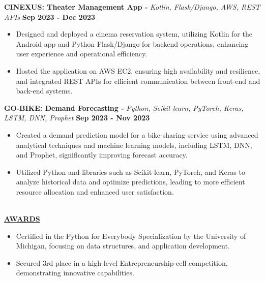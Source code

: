 \documentclass{article}
\begin{document}
\noindent \textbf{CINEXUS: Theater Management App -} \textit{Kotlin, Flask/Django, AWS, REST APIs} \hfill \textbf{Sep 2023 - Dec 2023}
\begin{itemize}[noitemsep,nolistsep,leftmargin=*]
\item {\small Designed and deployed a cinema reservation system, utilizing Kotlin for the Android app and Python Flask/Django for backend operations, enhancing user experience and operational efficiency.}
\item {\small Hosted the application on AWS EC2, ensuring high availability and resilience, and integrated REST APIs for efficient communication between front-end and back-end systems.}
\end{itemize}

\noindent \textbf{GO-BIKE: Demand Forecasting -} \textit{Python, Scikit-learn, PyTorch, Keras, LSTM, DNN, Prophet} \hfill \textbf{Sep 2023 - Nov 2023}
\begin{itemize}[noitemsep,nolistsep,leftmargin=*]
\item {\small Created a demand prediction model for a bike-sharing service using advanced analytical techniques and machine learning models, including LSTM, DNN, and Prophet, significantly improving forecast accuracy.}
\item {\small Utilized Python and libraries such as Scikit-learn, PyTorch, and Keras to analyze historical data and optimize predictions, leading to more efficient resource allocation and enhanced user satisfaction.}
\end{itemize}



\noindent \textbf{\underline{}} \\
\noindent \textbf{\underline{AWARDS}} 
\begin{itemize}[noitemsep,nolistsep,leftmargin=*]
\item {\small  Certified in the Python for Everybody Specialization by the University of Michigan, focusing on data structures, and application development. }
\end{itemize}
\begin{itemize}[noitemsep,nolistsep,leftmargin=*]
\item {\small Secured 3rd place in a high-level Entrepreneurship-cell competition, demonstrating innovative capabilities. }
\end{itemize}


\end{document}
